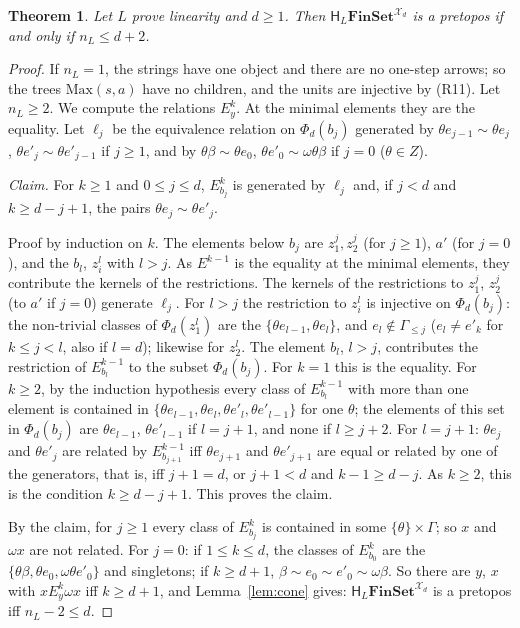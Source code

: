\documentclass[11pt]{amsart}
\newtheorem{thm}{Theorem}[section]
\theoremstyle{definition}
\newcommand{\Fin}{\mathbf{FinSet}}
\newcommand{\Max}{\mathrm{Max}}
\newcommand{\HH}{\mathsf H}
\newcommand{\cX}{\mathcal X}
\begin{document}
\begin{thm}\label{thm:Xd}
Let $L$ prove linearity and $d\ge1$. Then $\HH_L\Fin^{\cX_d}$ is a
pretopos if and only if $n_L\le d+2$.
\end{thm}
\begin{proof}
If $n_L=1$, the strings have one object and there are no one-step
arrows; so the trees $\Max(s,a)$ have no children, and the units are
injective by (R11). Let $n_L\ge2$. We compute the relations $E^k_y$.
At the minimal elements they are the equality. Let $\ell_j$ be the
equivalence relation on $\Phi_d(b_j)$ generated by $\theta
e_{j-1}\sim\theta e_j$, $\theta e'_j\sim\theta e'_{j-1}$ if $j\ge1$,
and by $\theta\beta\sim\theta e_0$, $\theta e'_0\sim\omega\theta\beta$
if $j=0$ ($\theta\in Z$).

\emph{Claim.} For $k\ge1$ and $0\le j\le d$, $E^k_{b_j}$ is generated
by $\ell_j$ and, if $j<d$ and $k\ge d-j+1$, the pairs $\theta
e_j\sim\theta e'_j$.

Proof by induction on $k$. The elements below $b_j$ are $z^j_1,z^j_2$
(for $j\ge1$), $a'$ (for $j=0$), and the $b_l$, $z^l_i$ with $l>j$. As
$E^{k-1}$ is the equality at the minimal elements, they contribute the
kernels of the restrictions. The kernels of the restrictions to
$z^j_1$, $z^j_2$ (to $a'$ if $j=0$) generate $\ell_j$. For $l>j$ the
restriction to $z^l_i$ is injective on $\Phi_d(b_j)$: the non-trivial
classes of $\Phi_d(z^l_1)$ are the $\{\theta e_{l-1},\theta e_l\}$, and
$e_l\notin\Gamma_{\le j}$ ($e_l\ne e'_k$ for $k\le j<l$, also if
$l=d$); likewise for $z^l_2$. The element $b_l$, $l>j$, contributes
the restriction of $E^{k-1}_{b_l}$ to the subset $\Phi_d(b_j)$. For
$k=1$ this is the equality. For $k\ge2$, by the induction hypothesis
every class of $E^{k-1}_{b_l}$ with more than one element is contained
in $\{\theta e_{l-1},\theta e_l,\theta e'_l,\theta e'_{l-1}\}$ for one
$\theta$; the elements of this set in $\Phi_d(b_j)$ are $\theta
e_{l-1}$, $\theta e'_{l-1}$ if $l=j+1$, and none if $l\ge j+2$. For
$l=j+1$: $\theta e_j$ and $\theta e'_j$ are related by
$E^{k-1}_{b_{j+1}}$ iff $\theta e_{j+1}$ and $\theta e'_{j+1}$ are
equal or related by one of the generators, that is, iff $j+1=d$, or
$j+1<d$ and $k-1\ge d-j$. As $k\ge2$, this is the condition $k\ge
d-j+1$. This proves the claim.

By the claim, for $j\ge1$ every class of $E^k_{b_j}$ is contained in
some $\{\theta\}\times\Gamma$; so $x$ and $\omega x$ are not related.
For $j=0$: if $1\le k\le d$, the classes of $E^k_{b_0}$ are the
$\{\theta\beta,\theta e_0,\omega\theta e'_0\}$ and singletons; if
$k\ge d+1$, $\beta\sim e_0\sim e'_0\sim\omega\beta$. So there are $y$,
$x$ with $x\mathrel{E^{k}_y}\omega x$ iff $k\ge d+1$, and
Lemma~\ref{lem:cone} gives: $\HH_L\Fin^{\cX_d}$ is a pretopos iff
$n_L-2\le d$.
\end{proof}
\end{document}
